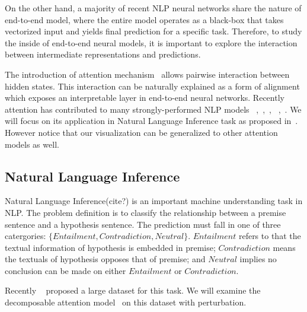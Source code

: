 On the other hand, a majority of recent NLP neural networks share the nature of 
end-to-end model, where the entire model operates as a black-box that takes 
vectorized input and yields final prediction for a specific task.
Therefore, to study the inside of end-to-end neural models, it is important to 
explore the interaction between intermediate representations and predictions.

The introduction of attention mechanism~\cite{bahdanau2014neural} allows 
pairwise interaction between hidden states. This interaction can be naturally explained
as a form of alignment which exposes an interpretable layer in end-to-end neural networks. 
Recently attention has contributed to many strongly-performed NLP models
~\cite{parikh2016emnlp},~\cite{rush2015neural},~\cite{yang2016hierarchical},
~\cite{seo2016bidirectional},~\cite{schwartz2017high}. 
We will focus on its application in Natural Language Inference task as proposed in~\cite{parikh2016emnlp}.
However notice that our visualization can be generalized to other attention models as well.




\subsection{Natural Language Inference}
Natural Language Inference(cite?) is an important machine understanding task in NLP. 
The problem definition is to classify the relationship between a premise sentence and a hypothesis sentence. 
The prediction must fall in one of three catergories: $\{Entailment, Contradiction, Neutral\}$. 
$Entailment$ refers to that the textual information of hypothesis is embedded in premise; 
$Contradiction$ means the textuals of hypothesis opposes that of premise; 
and $Neutral$ implies no conclusion can be made on either $Entailment$ or $Contradiction$.

Recently ~\cite{BowmanAngeliPotts2015} proposed a large dataset for this task. We will examine 
the decomposable attention model~\cite{parikh2016emnlp} on this dataset with perturbation. 




